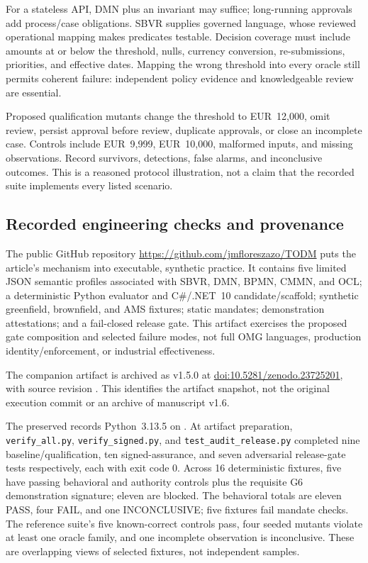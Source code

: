 \documentclass[11pt,a4paper]{article}
\newcommand{\PASS}{\textsf{PASS}}
\newcommand{\FAIL}{\textsf{FAIL}}
\newcommand{\INC}{\textsf{INCONCLUSIVE}}
\begin{document}
For a stateless API, DMN plus an invariant may suffice; long-running approvals add process/case obligations. SBVR supplies governed language, whose reviewed operational mapping makes predicates testable. Decision coverage must include amounts at or below the threshold, nulls, currency conversion, re-submissions, priorities, and effective dates. Mapping the wrong threshold into every oracle still permits coherent failure: independent policy evidence and knowledgeable review are essential.

Proposed qualification mutants change the threshold to EUR~12,000, omit review, persist approval before review, duplicate approvals, or close an incomplete case. Controls include EUR~9,999, EUR~10,000, malformed inputs, and missing observations. Record survivors, detections, false alarms, and inconclusive outcomes. This is a reasoned protocol illustration, not a claim that the recorded suite implements every listed scenario.

\subsection{Recorded engineering checks and provenance}
The public GitHub repository \url{https://github.com/jmfloreszazo/TODM} puts the article's mechanism into executable, synthetic practice. It contains five limited JSON semantic profiles associated with SBVR, DMN, BPMN, CMMN, and OCL; a deterministic Python evaluator and C\#/.NET~10 candidate/scaffold; synthetic greenfield, brownfield, and AMS fixtures; static mandates; demonstration attestations; and a fail-closed release gate. This artifact exercises the proposed gate composition and selected failure modes, not full OMG languages, production identity/enforcement, or industrial effectiveness.

The companion artifact is archived as v1.5.0 at \href{https://doi.org/10.5281/zenodo.23725201}{doi:10.5281/zenodo.23725201}, with source revision . This identifies the artifact snapshot, not the original execution commit or an archive of manuscript v1.6.

The preserved  records Python~3.13.5 on . At artifact preparation, \texttt{verify\_all.py}, \texttt{verify\_signed.py}, and \texttt{test\_audit\_release.py} completed nine baseline/qualification, ten signed-assurance, and seven adversarial release-gate tests respectively, each with exit code 0. Across 16 deterministic fixtures, five have passing behavioral and authority controls plus the requisite G6 demonstration signature; eleven are blocked. The behavioral totals are eleven \PASS{}, four \FAIL{}, and one \INC{}; five fixtures fail mandate checks. The reference suite's five known-correct controls pass, four seeded mutants violate at least one oracle family, and one incomplete observation is inconclusive. These are overlapping views of selected fixtures, not independent samples.
\end{document}
